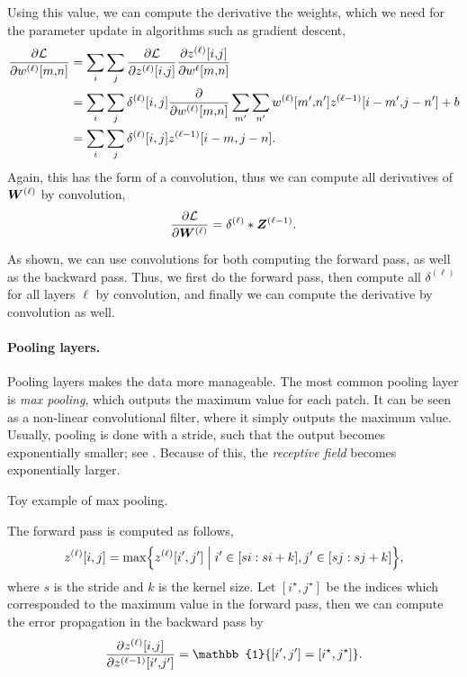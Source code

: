 Using this value, we can compute the derivative \wrt the weights, which we need for the parameter
update in algorithms such as gradient descent,
\begin{align*}
    \pdv{\mathcal{L}}{w^{(\ell)}[m{,}n]} & = \sum_{i} \sum_{j} \pdv{\mathcal{L}}{z^{(\ell)}[i{,}j]} \pdv{z^{(\ell)}[i{,}j]}{w^{\ell}[m{,}n]}                                        \\
                                         & = \sum_{i} \sum_{j} \delta^{(\ell)}[i,j] \pdv*{\sum_{m'} \sum_{n'} w^{(\ell)}[m'{,}n'] z^{(\ell-1)}[i-m'{,}j-n'] + b}{w^{(\ell)}[m{,}n]} \\
                                         & = \sum_{i} \sum_{j} \delta^{(\ell)}[i,j] z^{(\ell-1)}[i-m,j-n].
\end{align*}
Again, this has the form of a convolution, thus we can compute all derivatives of $\bm{W}^{(\ell)}$ by convolution, \[
    \pdv{\mathcal{L}}{\bm{W}^{(\ell)}} = \delta^{(\ell)} * \bm{Z}^{(\ell-1)}.
\]

As shown, we can use convolutions for both computing the forward pass, as well as the backward
pass. Thus, we first do the forward pass, then compute all $\delta^{(\ell)}$ for all layers $\ell$
by convolution, and finally we can compute the derivative by convolution as well.

\paragraph{Pooling layers.}

Pooling layers makes the data more manageable. The most common pooling layer is \textit{max
    pooling}, which outputs the maximum value for each patch. It can be seen as a non-linear
convolutional filter, where it simply outputs the maximum value. Usually, pooling is done with a
stride, such that the output becomes exponentially smaller; see . Because of
this, the \textit{receptive field} becomes exponentially larger.

\begin{marginfigure}
    \centering
    \caption{Toy example of max pooling.}
    \label{fig:max-pooling}
\end{marginfigure}

The forward pass is computed as follows,
\[
    z^{(\ell)}[i,j] = \max \lft\{ z^{(\ell)}[i',j'] \;\middle|\; i' \in [si:si+k], j' \in [sj:sj+k] \rgt\},
\]
where $s$ is the stride and $k$ is the kernel size. Let $[i^\star,j^\star]$ be the indices which
corresponded to the maximum value in the forward pass, then we can compute the error propagation in
the backward pass by \[
    \pdv{z^{(\ell)}[i{,}j]}{z^{(\ell-1)}[i'{,}j']} = \mathbb{1}\{ [i',j'] = [i^\star,j^\star] \}.
\]

